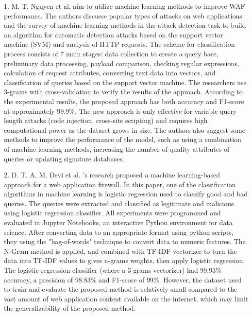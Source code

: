 1.	M. T. Nguyen et al. \cite{Truong} aim to utilize machine learning methods to improve WAF performance. The authors discusse popular types of attacks on web applications and the survey of machine learning methods in the attack detection task to build an algorithm for automatic detection attacks based on the support vector machine (SVM) and analysis of HTTP requests. The scheme for classification process consists of 7 main stages: data  collection  to create a query base, preliminary data processing, payload comparison, checking regular expressions, calculation of request attributes, converting text data into vectors, and classification of queries based on the support vector machine. The researchers use 3-grams with cross-validation to verify the results of the approach. According to the experimental results, the proposed approach has both accuracy and F1-score at approximately 99.9\%. The new approach is only effective for variable query length attacks (code injection, cross-site scripting) and requires high computational power as the dataset grows in size. The authors also suggest some methods to improve the performance of the model, such as using a combination of machine learning methods, increasing the number of quality attributes of queries or updating signature databases.

2.	D. T. A. M. Devi et al. \cite{Devi}'s research proposed a machine learning-based approach for a web application firewall. In this paper, one of the classification algorithms in machine learning is logistic regression used to classify good and bad queries. The queries were extracted and classified as legitimate and malicious using logistic regression classifier. All experiments were programmed and evaluated in
Jupyter Notebooks, an interactive Python environment for data science. After converting data to an appropriate format using python scripts, they using the "bag-of-words" technique to convert data to numeric features. The N-Gram method is applied, and combined with TF-IDF vectorizer to turn the data into TF-IDF values to gives n-grams weights, then apply logistic regression. The logistic regression classifier (where a 3-grams vectorizer) had 99.93\% accuracy, a precision of 98.83\% and F1-score of 99\%. However, the dataset used to train and evaluate the proposed method is relatively small compared to the vast amount of web application content available on the internet, which may limit the generalizability of the proposed method.

